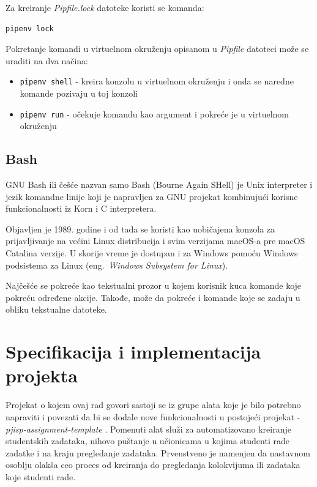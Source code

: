 \documentclass[12pt]{report}
\begin{document}
Za kreiranje \textit{Pipfile.lock} datoteke koristi se komanda:

\begin{verbatim}
pipenv lock
\end{verbatim}

Pokretanje komandi u virtuelnom okruženju opisanom u \textit{Pipfile} datoteci može se uraditi na dva načina:

\begin{itemize}
    \item \texttt{pipenv shell} - kreira konzolu u virtuelnom okruženju i onda se naredne komande pozivaju u toj konzoli
    \item \texttt{pipenv run} - očekuje komandu kao argument i pokreće je u virtuelnom okruženju
\end{itemize}

\section{Bash}

GNU Bash \cite{bash} ili češće nazvan samo Bash (Bourne Again SHell) je Unix interpreter i jezik komandne linije koji je napravljen za GNU projekat kombinujući korisne funkcionalnosti iz Korn i C interpretera.

Objavljen je 1989. godine i od tada se koristi kao uobičajena konzola za prijavljivanje na većini Linux distribucija i svim verzijama macOS-a pre macOS Catalina verzije. U skorije vreme je dostupan i za Windows pomoću Windows podsistema za Linux (eng.\ \textit{Windows Subsystem for Linux}).

Najčešće se pokreće kao tekstualni prozor u kojem korisnik kuca komande koje pokreću određene akcije. Takođe, može da pokreće i komande koje se zadaju u obliku tekstualne datoteke.

\chapter{Specifikacija i implementacija projekta}

Projekat o kojem ovaj rad govori sastoji se iz grupe alata koje je bilo potrebno napraviti i povezati da bi se dodale nove funkcionalnosti u postojeći projekat - \textit{pjisp-assignment-template} \cite{pjisp-assignment-template}. Pomenuti alat služi za automatizovano kreiranje studentskih zadataka, nihovo puštanje u učionicama u kojima studenti rade zadatke i na kraju pregledanje zadataka. Prvenstveno je namenjen da nastavnom osoblju olakša ceo proces od kreiranja do pregledanja kolokvijuma ili zadataka koje studenti rade.
\end{document}

